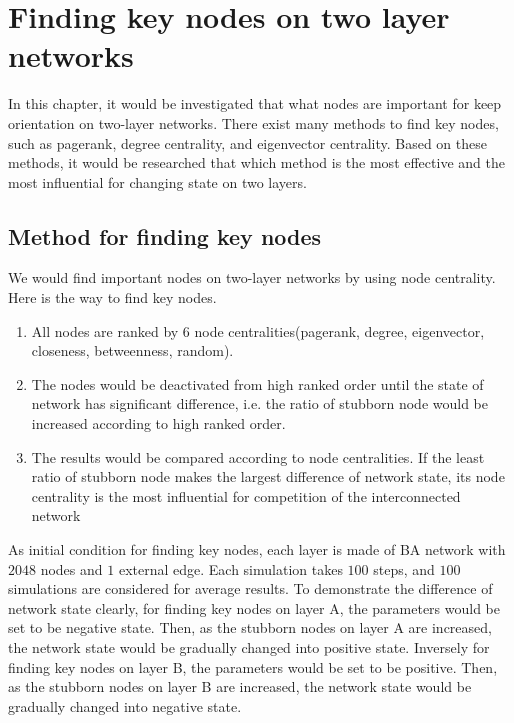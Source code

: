 
\chapter{Finding key nodes on two layer networks}
\label{chap:finding key nodes on two layer networks}
In this chapter, it would be investigated that what nodes are important for keep orientation on two-layer networks. There exist many methods to find key nodes, such as pagerank, degree centrality, and eigenvector centrality. Based on these methods, it would be researched that which method is the most effective and the most influential for changing state on two layers.  

\section{Method for finding key nodes}
We would find important nodes on two-layer networks by using node centrality. Here is the way to find key nodes.
\begin{enumerate}[(1)]
	\item All nodes are ranked by 6 node centralities(pagerank, degree, eigenvector, closeness, betweenness, random).
	\item The nodes would be deactivated from high ranked order until the state of network has significant difference, i.e. the ratio of stubborn node would be increased according to high ranked order. 
	\item The results would be compared according to node centralities. If the least ratio of stubborn node makes the largest difference of network state, its node centrality is the most influential for competition of the interconnected network
\end{enumerate}

As initial condition for finding key nodes, each layer is made of BA network with $2048$ nodes and $1$ external edge. Each simulation takes $100$ steps, and $100$ simulations are considered for average results. To demonstrate the difference of network state clearly, for finding key nodes on layer A, the parameters would be set to be negative state. Then, as the stubborn nodes on layer A are increased, the network state would be gradually changed into positive state.  Inversely for finding key nodes on layer B, the parameters would be set to be positive. Then, as the stubborn nodes on layer B are increased, the network state would be gradually changed into negative state.   

